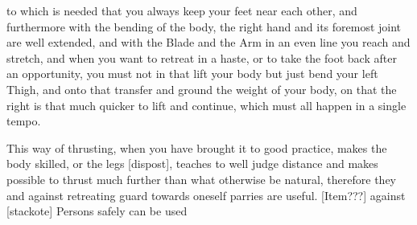 \newpage


\newpage


to which is needed that you always keep your feet near each other, 
and furthermore with the bending of the body, the right hand and its
foremost joint are well extended, and with the Blade and the Arm in an
even line you reach and stretch, and when you want to retreat in a
haste, or to take the foot back after an opportunity, you must not in
that lift your body but just bend your left Thigh, and onto that
transfer and ground the weight of your body, on that the right is
that much quicker to lift and continue, which must all happen in a
single tempo.


This way of thrusting, when you have brought it to good practice,
makes the body skilled, or the legs [dispost], teaches to well judge distance
and makes possible to thrust much further than what otherwise be
natural, therefore they and against retreating guard towards oneself
parries are useful. [Item???] against [stackote] Persons safely can be
used


